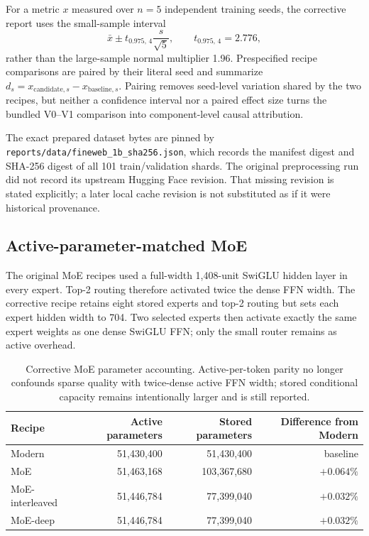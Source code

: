 \documentclass[11pt,a4paper]{article}
\theoremstyle{definition}
\theoremstyle{plain}
\begin{document}
For a metric $x$ measured over $n=5$ independent training seeds, the corrective
report uses the small-sample interval
\[
    \bar{x} \pm t_{0.975,\,4}\frac{s}{\sqrt{5}},
    \qquad t_{0.975,\,4}=2.776,
\]
rather than the large-sample normal multiplier 1.96.  Prespecified recipe
comparisons are paired by their literal seed and summarize
$d_s=x_{\mathrm{candidate},s}-x_{\mathrm{baseline},s}$.  Pairing removes seed-level
variation shared by the two recipes, but neither a confidence interval nor a paired
effect size turns the bundled V0--V1 comparison into component-level causal
attribution.

The exact prepared dataset bytes are pinned by
\texttt{reports/data/fineweb\_1b\_sha256.json}, which records the manifest digest and
SHA-256 digest of all 101 train/validation shards.  The original preprocessing run
did not record its upstream Hugging Face revision.  That missing revision is stated
explicitly; a later local cache revision is not substituted as if it were historical
provenance.

\subsection{Active-parameter-matched MoE}

The original MoE recipes used a full-width 1,408-unit SwiGLU hidden layer in every
expert.  Top-2 routing therefore activated twice the dense FFN width.  The corrective
recipe retains eight stored experts and top-2 routing but sets each expert hidden
width to 704.  Two selected experts then activate exactly the same expert weights as
one dense SwiGLU FFN; only the small router remains as active overhead.

\begin{table}[H]
\centering
\small
\begin{tabular}{lrrr}
\toprule
Recipe & Active parameters & Stored parameters & Difference from Modern \\
\midrule
Modern & 51,430,400 & 51,430,400 & baseline \\
MoE & 51,463,168 & 103,367,680 & $+0.064\%$ \\
MoE-interleaved & 51,446,784 & 77,399,040 & $+0.032\%$ \\
MoE-deep & 51,446,784 & 77,399,040 & $+0.032\%$ \\
\bottomrule
\end{tabular}
\caption{Corrective MoE parameter accounting.  Active-per-token parity no longer
confounds sparse quality with twice-dense active FFN width; stored conditional
capacity remains intentionally larger and is still reported.}
\label{tab:corrective-moe-parameter-counts}
\end{table}
\end{document}
